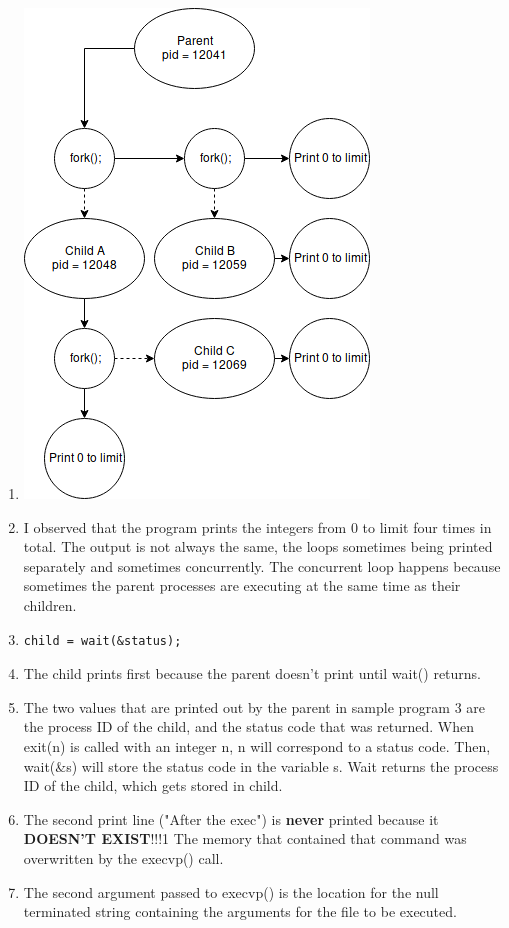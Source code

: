 \documentclass{article}
\begin{document}
\begin{enumerate}
    \item
    \includegraphics[scale=0.6]{index.png}
    
    \item I observed that the program prints the integers from 0 to limit four times in total. The output is not always the same, the loops sometimes being printed separately and sometimes concurrently. The concurrent loop happens because sometimes the parent processes are executing at the same time as their children.
    
    \item
    \begin{verbatim}
child = wait(&status);\end{verbatim}
    \item The child prints first  because the parent doesn't print until wait() returns.
    
    \item The two values that are printed out by the parent in sample program 3 are the process ID of the child, and the status code that was returned. When exit(n) is called with an integer n, n will correspond to a status code. Then, wait(\&s) will store the status code in the variable s. Wait returns the process ID of the child, which gets stored in child.
    
    \item The second print line ("After the exec") is \textbf{never} printed because it \textbf{DOESN'T EXIST}!!!1 The memory that contained that command was overwritten by the execvp() call.
    
    \item The second argument passed to execvp() is the location for the null terminated string containing the arguments for the file to be executed.    
    
\end{enumerate}
\end{document}
